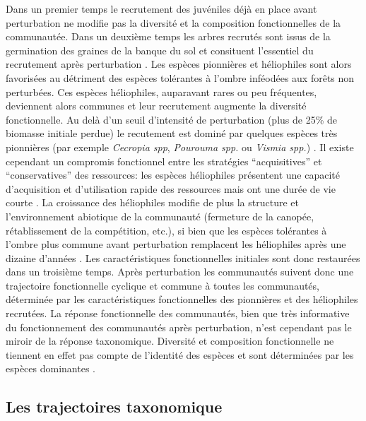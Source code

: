 \documentclass[
  11pt,
  french,
  A4paper,
  extrafontsizes,onecolumn,openright
  ]{memoir}
\begin{document}
Dans un premier temps le recrutement des juvéniles déjà en place avant
perturbation ne modifie pas la diversité et la composition
fonctionnelles de la communautée. Dans un deuxième temps les arbres
recrutés sont issus de la germination des graines de la banque du sol et
consituent l'essentiel du recrutement après perturbation
\autocite{Lawton1988}. Les espèces pionnières et héliophiles sont alors
favorisées au détriment des espèces tolérantes à l'ombre inféodées aux
forêts non perturbées. Ces espèces héliophiles, auparavant rares ou peu
fréquentes, deviennent alors communes et leur recrutement augmente la
diversité fonctionnelle. Au delà d'un seuil d'intensité de perturbation
(plus de 25\% de biomasse initiale perdue) le recutement est dominé par
quelques espèces très pionnières (par exemple \emph{Cecropia spp},
\emph{Pourouma spp.} ou \emph{Vismia spp.}) \autocite{Guitet2018}. Il
existe cependant un compromis fonctionnel entre les stratégies
``acquisitives'' et ``conservatives'' des ressources: les espèces
héliophiles présentent une capacité d'acquisition et d'utilisation
rapide des ressources mais ont une durée de vie courte
\autocite{Falster2011}. La croissance des héliophiles modifie de plus la
structure et l'environnement abiotique de la communauté (fermeture de la
canopée, rétablissement de la compétition, etc.), si bien que les
espèces tolérantes à l'ombre plus commune avant perturbation remplacent
les héliophiles après une dizaine d'années \autocite{Denslow2000}. Les
caractéristiques fonctionnelles initiales sont donc restaurées dans un
troisième temps. Après perturbation les communautés suivent donc une
trajectoire fonctionnelle cyclique et commune à toutes les communautés,
déterminée par les caractéristiques fonctionnelles des pionnières et des
héliophiles recrutées. La réponse fonctionnelle des communautés, bien
que très informative du fonctionnement des communautés après
perturbation, n'est cependant pas le miroir de la réponse taxonomique.
Diversité et composition fonctionnelle ne tiennent en effet pas compte
de l'identité des espèces et sont déterminées par les espèces dominantes
\autocites{Grime1998}{Lavorel2002}.

\subsection{Les trajectoires
taxonomique}\label{les-trajectoires-taxonomique}
\end{document}
